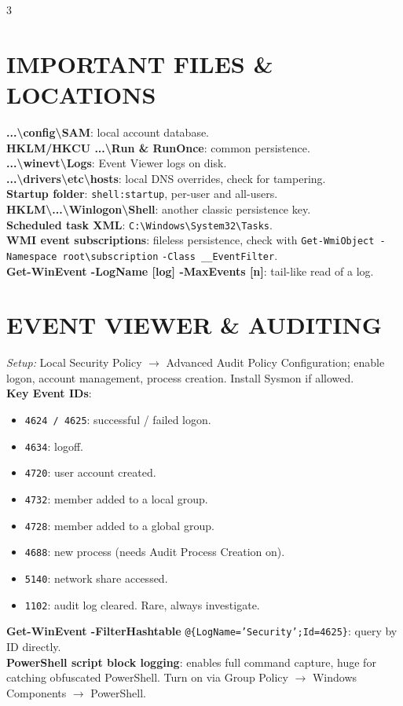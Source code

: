 \documentclass[7pt,landscape]{article}
\begin{document}
\begin{multicols*}{3}
\section{IMPORTANT FILES \& LOCATIONS}
\textbf{...\textbackslash config\textbackslash SAM}: local account database. \\
\textbf{HKLM/HKCU ...\textbackslash Run \& RunOnce}: common persistence. \\
\textbf{...\textbackslash winevt\textbackslash Logs}: Event Viewer logs on disk. \\
\textbf{...\textbackslash drivers\textbackslash etc\textbackslash hosts}: local DNS overrides, check for tampering. \\
\textbf{Startup folder}: \texttt{shell:startup}, per-user and all-users. \\
\textbf{HKLM\textbackslash ...\textbackslash Winlogon\textbackslash Shell}: another classic persistence key. \\
\textbf{Scheduled task XML}: \texttt{C:\textbackslash Windows\textbackslash System32\textbackslash Tasks}. \\
\textbf{WMI event subscriptions}: fileless persistence, check with \texttt{Get-WmiObject -Namespace root\textbackslash subscription} \newline \texttt{-Class \_\_EventFilter}. \\
\textbf{Get-WinEvent -LogName [log] -MaxEvents [n]}: tail-like read of a log.

\section{EVENT VIEWER \& AUDITING}
\textit{Setup:} Local Security Policy $\rightarrow$ Advanced Audit Policy Configuration; enable logon, account management, process creation. Install Sysmon if allowed. \\
\textbf{Key Event IDs}:
\begin{itemize}
    \item \texttt{4624 / 4625}: successful / failed logon.
    \item \texttt{4634}: logoff.
    \item \texttt{4720}: user account created.
    \item \texttt{4732}: member added to a local group.
    \item \texttt{4728}: member added to a global group.
    \item \texttt{4688}: new process (needs Audit Process Creation on).
    \item \texttt{5140}: network share accessed.
    \item \texttt{1102}: audit log cleared. Rare, always investigate.
\end{itemize}
\textbf{Get-WinEvent -FilterHashtable} \newline \texttt{@\{LogName='Security';Id=4625\}}: query by ID directly. \\
\textbf{PowerShell script block logging}: enables full command capture, huge for catching obfuscated PowerShell. Turn on via Group Policy $\rightarrow$ Windows Components $\rightarrow$ PowerShell.


\end{multicols*}
\end{document}
